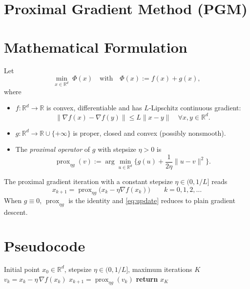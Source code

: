 \documentclass{article}
\begin{document}
\section*{Proximal Gradient Method (PGM)}

\section*{Mathematical Formulation}
Let 
\[
\min_{x\in\mathbb{R}^{d}} \; \Phi(x)\quad\text{with}\quad \Phi(x):=f(x)+g(x),
\]
where  

\begin{itemize}
  \item $f:\mathbb{R}^{d}\to\mathbb{R}$ is convex, differentiable and has $L$‑Lipschitz continuous gradient:
        \[
        \|\nabla f(x)-\nabla f(y)\|\le L\|x-y\|\quad\forall x,y\in\mathbb{R}^{d}.
        \]
  \item $g:\mathbb{R}^{d}\to\mathbb{R}\cup\{+\infty\}$ is proper, closed and convex (possibly nonsmooth).
  \item The \emph{proximal operator} of $g$ with stepsize $\eta>0$ is
        \[
        \operatorname{prox}_{\eta g}(v):=\arg\min_{u\in\mathbb{R}^{d}}\Big\{g(u)+\frac{1}{2\eta}\|u-v\|^{2}\Big\}.
        \]
\end{itemize}
The proximal gradient iteration with a constant stepsize $\eta\in(0,1/L]$ reads
\begin{equation}
\boxed{x_{k+1}= \operatorname{prox}_{\eta g}\!\big(x_{k}-\eta \nabla f(x_{k})\big)}\qquad k=0,1,2,\dots
\label{eq:update}
\end{equation}
When $g\equiv0$, $\operatorname{prox}_{\eta g}$ is the identity and \eqref{eq:update} reduces to plain gradient descent.

\section*{Pseudocode}
\begin{algorithm}[H]
\caption{Proximal Gradient Method}
\begin{algorithmic}[1]
\Require Initial point $x_{0}\in\mathbb{R}^{d}$, stepsize $\eta\in(0,1/L]$, maximum iterations $K$
    \State $v_{k}=x_{k}-\eta\,\nabla f(x_{k})$ 
    \State $x_{k+1}= \operatorname{prox}_{\eta g}(v_{k})$ 
\EndFor
\State \textbf{return} $x_{K}$
\end{algorithmic}
\end{algorithm}
\end{document}
